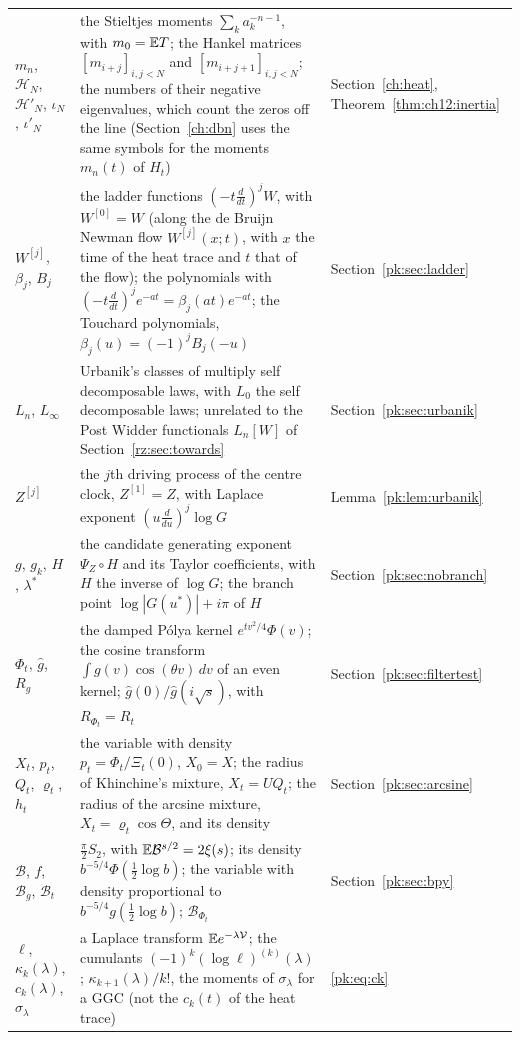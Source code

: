 {\begin{longtable}{@{}p{}p{}p{}@{}}
$m_n$, $\mathcal H_N$, $\mathcal H'_N$, $\iota_N$, $\iota'_N$ & \raggedright the Stieltjes moments ${\sum_ka_k^{-n-1}}$, with ${m_0=\mathbb{E} T}$; the Hankel matrices ${[m_{i+j}]_{i,j<N}}$ and ${[m_{i+j+1}]_{i,j<N}}$; the numbers of their negative eigenvalues, which count the zeros off the line (Section~\ref{ch:dbn} uses the same symbols for the moments $m_n(t)$ of $H_t$) & \raggedright Section~\ref{ch:heat}, Theorem~\ref{thm:ch12:inertia}\tabularnewline
$W^{[j]}$, $\beta_j$, $B_j$ & \raggedright the ladder functions ${(-t\frac d{dt})^jW}$, with ${W^{[0]}=W}$ (along the de Bruijn Newman flow $W^{[j]}(x;t)$, with $x$ the time of the heat trace and $t$ that of the flow); the polynomials with ${(-t\frac d{dt})^je^{-at}=\beta_j(at)e^{-at}}$; the Touchard polynomials, ${\beta_j(u)=(-1)^jB_j(-u)}$ & \raggedright Section~\ref{pk:sec:ladder}\tabularnewline
$L_n$, $L_\infty$ & \raggedright Urbanik's classes of multiply self decomposable laws, with $L_0$ the self decomposable laws; unrelated to the Post Widder functionals $L_n[W]$ of Section~\ref{rz:sec:towards} & \raggedright Section~\ref{pk:sec:urbanik}\tabularnewline
$Z^{[j]}$ & \raggedright the $j$th driving process of the centre clock, ${Z^{[1]}=Z}$, with Laplace exponent ${(u\frac d{du})^j\log G}$ & \raggedright Lemma~\ref{pk:lem:urbanik}\tabularnewline
$g$, $g_k$, $H$, $\lambda^*$ & \raggedright the candidate generating exponent ${\Psi_Z\circ H}$ and its Taylor coefficients, with $H$ the inverse of $\log G$; the branch point ${\log|G(u^*)|+i\pi}$ of $H$ & \raggedright Section~\ref{pk:sec:nobranch}\tabularnewline
$\Phi_t$, $\widehat g$, $R_g$ & \raggedright the damped P\'olya kernel ${e^{tv^2/4}\Phi(v)}$; the cosine transform ${\int g(v)\cos(\theta v)\,dv}$ of an even kernel; ${\widehat g(0)/\widehat g(i\sqrt s)}$, with ${R_{\Phi_t}=R_t}$ & \raggedright Section~\ref{pk:sec:filtertest}\tabularnewline
$X_t$, $p_t$, $Q_t$, $\varrho_t$, $h_t$ & \raggedright the variable with density ${p_t=\Phi_t/\Xi_t(0)}$, ${X_0=X}$; the radius of Khinchine's mixture, ${X_t=UQ_t}$; the radius of the arcsine mixture, ${X_t=\varrho_t\cos\Theta}$, and its density & \raggedright Section~\ref{pk:sec:arcsine}\tabularnewline
$\mathcal B$, $f$, $\mathcal B_g$, $\mathcal B_t$ & \raggedright ${\frac\pi2S_2}$, with ${\mathbb{E}\mathcal B^{s/2}=2\xi(s)}$; its density ${b^{-5/4}\Phi(\frac12\log b)}$; the variable with density proportional to ${b^{-5/4}g(\frac12\log b)}$; ${\mathcal B_{\Phi_t}}$ & \raggedright Section~\ref{pk:sec:bpy}\tabularnewline
$\ell$, $\kappa_k(\lambda)$, $c_k(\lambda)$, $\sigma_\lambda$ & \raggedright a Laplace transform ${\mathbb{E} e^{-\lambda\mathcal V}}$; the cumulants ${(-1)^k(\log\ell)^{(k)}(\lambda)}$; ${\kappa_{k+1}(\lambda)/k!}$, the moments of $\sigma_\lambda$ for a GGC (not the $c_k(t)$ of the heat trace) & \raggedright \eqref{pk:eq:ck}\tabularnewline

\end{longtable}}
